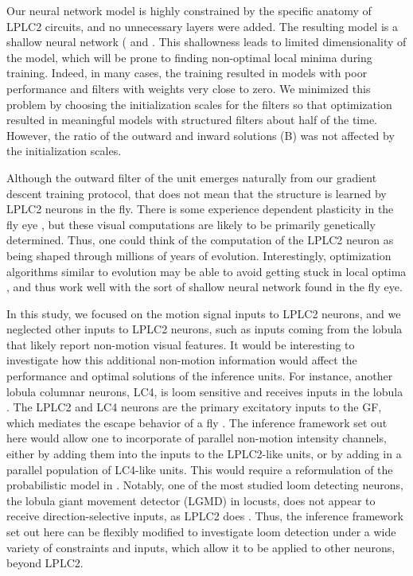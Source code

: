 \documentclass[pdftex,9pt,lineno]{elife}
\begin{document}
Our neural network model is highly constrained by the specific anatomy of LPLC2 circuits, and no unnecessary layers were added. The resulting model is a shallow neural network ( and . This shallowness leads to limited dimensionality of the model, which will be prone to finding non-optimal local minima during training. Indeed, in many cases, the training resulted in models with poor performance and filters with weights very close to zero. We minimized this problem by choosing the initialization scales for the filters so that optimization resulted in meaningful models with structured filters about half of the time. However, the ratio of the outward and inward solutions (B) was not affected by the initialization scales.

Although the outward filter of the unit emerges naturally from our gradient descent training protocol, that does not mean that the structure is learned by LPLC2 neurons in the fly. There is some experience dependent plasticity in the fly eye \citep{kikuchi2012experience}, but these visual computations are likely to be primarily genetically determined. Thus, one could think of the computation of the LPLC2 neuron as being shaped through millions of years of evolution. Interestingly, optimization algorithms similar to evolution may be able to avoid getting stuck in local optima \citep{stanley2019designing}, and thus work well with the sort of shallow neural network found in the fly eye.

In this study, we focused on the motion signal inputs to LPLC2 neurons, and we neglected other inputs to LPLC2 neurons, such as inputs coming from the lobula that likely report non-motion visual features. It would be interesting to investigate how this additional non-motion information would affect the performance and optimal solutions of the inference units. For instance, another lobula columnar neurons, LC4, is loom sensitive and receives inputs in the lobula \citep{von2017feature}. The LPLC2 and LC4 neurons are the primary excitatory inputs to the GF, which mediates the escape behavior of a fly \citep{von2014spike, ache2019neural}. The inference framework set out here would allow one to incorporate of parallel non-motion intensity channels, either by adding them into the inputs to the LPLC2-like units, or by adding in a parallel population of LC4-like units. This would require a reformulation of the probabilistic model in . Notably, one of the most studied loom detecting neurons, the lobula giant movement detector (LGMD) in locusts, does not appear to receive direction-selective inputs, as LPLC2 does \citep{rind1996neural,gabbiani1999computation}. Thus, the inference framework set out here can be flexibly modified to investigate loom detection under a wide variety of constraints and inputs, which allow it to be applied to other neurons, beyond LPLC2. 
\end{document}
